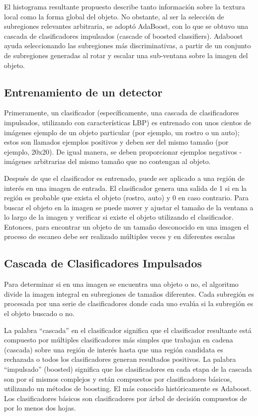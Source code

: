 El histograma resultante propuesto describe tanto información sobre la textura local como la forma global del objeto.
No obstante, al ser la selección de subregiones relevantes arbitraria, se adoptó AdaBoost, con lo que se obtuvo una cascada de clasificadores impulsados (cascade of boosted classifiers). Adaboost \parencite{Viola2001-rh} ayuda seleccionando las subregiones más discriminativas, a partir de un conjunto de subregiones generadas al rotar y escalar una sub-ventana sobre la imagen del objeto. 

\subsection{Entrenamiento de un detector}
Primeramente, un clasificador (específicamente, una cascada de clasificadores impulsados, utilizando con características LBP) es entrenado con unos cientos de imágenes ejemplo de un objeto particular (por ejemplo, un rostro o un auto); estos son llamados ejemplos positivos y deben ser del mismo tamaño (por ejemplo, 20x20). De igual manera, se deben proporcionar ejemplos negativos - imágenes arbitrarias del mismo tamaño que no contengan al objeto.

Después de que el clasificador es entrenado, puede ser aplicado a una región de interés en una imagen de entrada. El clasificador genera una salida de 1 si en la región es probable que exista el objeto (rostro, auto) y 0 en caso contrario. Para buscar el objeto en la imagen se puede mover y ajustar el tamaño de la ventana a lo largo de la imagen y verificar si existe el objeto utilizando el clasificador. Entonces, para encontrar un objeto de un tamaño desconocido en una imagen el proceso de escaneo debe ser realizado múltiples veces y en diferentes escalas \parencite{OpenCV2016-vq}


\subsection{Cascada de Clasificadores Impulsados}
Para determinar si en una imagen se encuentra una objeto o no, el algoritmo divide la imagen integral en subregiones de tamaños diferentes. Cada subregión es procesada por una serie de clasificadores donde cada uno evalúa si la subregión es el objeto buscado o no.

La palabra “cascada” en el clasificador significa que el clasificador resultante está compuesto por múltiples clasificadores más simples que trabajan en cadena (cascada) sobre una región de interés hasta que una región candidata es rechazada o todos los clasificadores generan resultados positivos. La palabra “impulsado” (boosted) significa que los clasificadores en cada etapa de la cascada son por sí mismos complejos y están compuestos por clasificadores básicos, utilizando un métodos de boosting. El más conocido históricamente es Adaboost. Los clasificadores básicos son clasificadores por árbol de decisión compuestos de por lo menos dos hojas.

